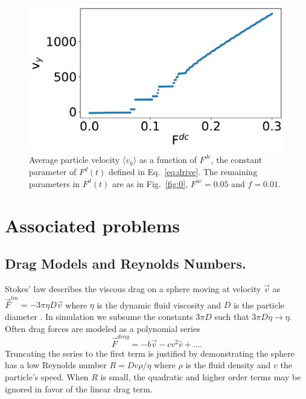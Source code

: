 \documentclass[twocolumn,preprintnumbers,amsmath,amssymb,aps,prx]{revtex4}
\begin{document}
\begin{center}
\begin{figure}[h!]
\centering
\includegraphics[width=\columnwidth]{sweep_FDC_vs_vx.pdf}
\caption{Average particle velocity  $\langle v_{y} \rangle$ as a function of $F^{dc}$,
  the constant parameter of $F^d(t)$ defined in Eq.~\ref{eq:drive}.
  The remaining parameters in $F^d(t)$ are as in Fig.~\ref{fig:0}, $F^{ac}=0.05$ and $f = 0.01$. }
\label{fig:1}
\end{figure}
\end{center}


\section{Associated problems}
\label{sec:problems}	%

\subsection{Drag Models and Reynolds Numbers.}
  Stokes' law describes the viscous drag on a sphere
  moving at velocity $\vec{v}$ as 
  $\vec{F}^{lin} = -3 \pi \eta D \vec{v}$ 
  where $\eta$ is the dynamic fluid viscosity and 
  $D$ is the particle diameter \cite{Taylor2005}.
  In simulation we
  subsume the constants $3 \pi D$
  such that $3 \pi D \eta \rightarrow \eta $.
  Often drag forces are
  modeled as a polynomial series ~\cite{Taylor2005}
  \begin{equation}
    \vec{F}^{drag} = -b \vec{v} - c v^2 \hat{v} + \ldots  .
  \end{equation}
  Truncating the series to the first term
  is justified by demonstrating the sphere
  has a low Reynolds number  
  $R = D v \rho / \eta$
  where $\rho$ is the fluid density and $v$ the particle's speed.
  When $R$ is small, the quadratic and higher order terms
  may be ignored in favor of the linear drag term.
\end{document}
